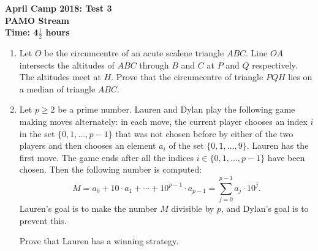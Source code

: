 \documentclass[a4paper,12pt]{article}
\begin{document}
\setcounter{page}{1}

\begin{center}
	\textbf{April Camp 2018: Test 3}\\
	\textbf{PAMO Stream}\\
	\textbf{Time: 4$\frac{1}{2}$ hours}
\end{center}

\begin{enumerate}
\vspace{0.2cm}

\item %
Let $O$ be the circumcentre of an acute scalene triangle $ABC$. Line $OA$ intersects the altitudes of $ABC$ through $B$ and $C$ at $P$ and $Q$ respectively. The altitudes meet at $H$. Prove that the circumcentre of triangle $PQH$ lies on a median of triangle $ABC$.


\item %
Let $p \geq 2$ be a prime number. Lauren and Dylan play the following game making moves alternately: in each move, the current player chooses an index $i$ in the set $\{0, 1, \dotsc, p-1\}$ that was not chosen before by either of the two players and then chooses an element $a_i$ of the set $\{0, 1, \dotsc, 9\}$. Lauren has the first move. The game ends after all the indices $i \in \{0, 1, \dotsc, p-1\}$ have been chosen. Then the following number is computed:
\[ M = a_0 +10\cdot a_1 +\dotsb +10^{p-1} \cdot a_{p-1} = \sum_{j=0}^{p-1} a_j \cdot 10^j. \]
Lauren's goal is to make the number $M$ divisible by $p$, and Dylan's goal is to prevent this.

Prove that Lauren has a winning strategy.

\end{enumerate}
\end{document}
